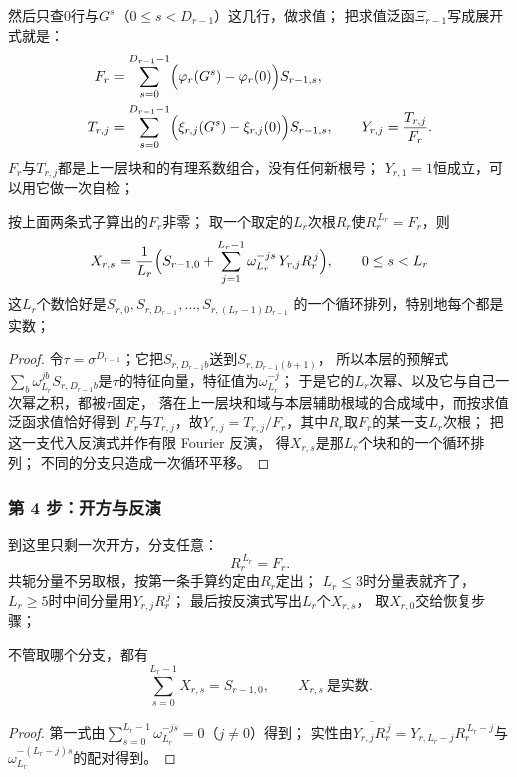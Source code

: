 \documentclass[UTF8,a4paper,11pt]{ctexart}
\begin{document}
然后只查$0$行与$G^s$（$0\le s<D_{r-1}$）这几行，做求值；
把求值泛函$\Xi_{r-1}$写成展开式就是：
\begin{align}
 F_r&=\sum_{s=0}^{D_{r-1}-1}\Bigl(\varphi_r(G^s)-\varphi_r(0)\Bigr)S_{r-1,s},\\
 T_{r,j}&=\sum_{s=0}^{D_{r-1}-1}\Bigl(\xi_{r,j}(G^s)-\xi_{r,j}(0)\Bigr)S_{r-1,s},
 \qquad Y_{r,j}=\frac{T_{r,j}}{F_r}.
\end{align}
$F_r$与$T_{r,j}$都是上一层块和的有理系数组合，没有任何新根号；
$Y_{r,1}=1$恒成立，可以用它做一次自检；\par

\begin{theorem}[一层下降]
按上面两条式子算出的$F_r$非零；
取一个取定的$L_r$次根$R_r$使$R_r^{\,L_r}=F_r$，则
\[
 X_{r,s}=\frac1{L_r}\Bigl(S_{r-1,0}
 +\sum_{j=1}^{L_r-1}\omega_{L_r}^{-js}\,Y_{r,j}R_r^{\,j}\Bigr),
 \qquad 0\le s<L_r
\]
这$L_r$个数恰好是$S_{r,0},S_{r,D_{r-1}},\dots,S_{r,(L_r-1)D_{r-1}}$
的一个循环排列，特别地每个都是实数；
\end{theorem}
\begin{proof}
令$\tau=\sigma^{D_{r-1}}$；它把$S_{r,D_{r-1}b}$送到$S_{r,D_{r-1}(b+1)}$，
所以本层的预解式$\sum_b\omega_{L_r}^{jb}S_{r,D_{r-1}b}$是$\tau$的特征向量，特征值为$\omega_{L_r}^{-j}$；
于是它的$L_r$次幂、以及它与自己一次幂之积，都被$\tau$固定，
落在上一层块和域与本层辅助根域的合成域中，而按求值泛函求值恰好得到
$F_r$与$T_{r,j}$，故$Y_{r,j}=T_{r,j}/F_r$，其中$R_r$取$F_r$的某一支$L_r$次根；
把这一支代入反演式并作有限 Fourier 反演，
得$X_{r,s}$是那$L_r$个块和的一个循环排列；
不同的分支只造成一次循环平移。
\end{proof}

\subsubsection{第 4 步：开方与反演}
到这里只剩一次开方，分支任意：
\[
 R_r^{\,L_r}=F_r .
\]
共轭分量不另取根，按第一条手算约定由$R_r$定出；
$L_r\le3$时分量表就齐了，$L_r\ge5$时中间分量用$Y_{r,j}R_r^{\,j}$；
最后按反演式写出$L_r$个$X_{r,s}$，
取$X_{r,0}$交给恢复步骤；

\begin{proposition}
不管取哪个分支，都有
\[
 \sum_{s=0}^{L_r-1}X_{r,s}=S_{r-1,0},
 \qquad
 X_{r,s}\ \text{是实数}.
\]
\end{proposition}
\begin{proof}
第一式由$\sum_{s=0}^{L_r-1}\omega_{L_r}^{-js}=0$（$j\ne0$）得到；
实性由$\overline{Y_{r,j}R_r^{\,j}}=Y_{r,L_r-j}R_r^{\,L_r-j}$与$\omega_{L_r}^{-(L_r-j)s}$的配对得到。
\end{proof}
\end{document}
